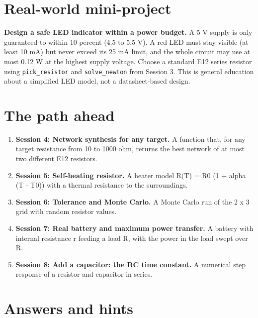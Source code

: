 \documentclass[11pt,a4paper]{article}
\begin{document}
\section{Real-world mini-project}
\textbf{Design a safe LED indicator within a power budget.} A 5 V supply is only guaranteed to within 10 percent (4.5 to 5.5 V). A red LED must stay visible (at least 10 mA) but never exceed its 25 mA limit, and the whole circuit may use at most 0.12 W at the highest supply voltage. Choose a standard E12 series resistor using \texttt{pick\_resistor} and \texttt{solve\_newton} from Session 3. This is general education about a simplified LED model, not a datasheet-based design.

\section{The path ahead}
\begin{enumerate}[nosep]
\item \textbf{Session 4: Network synthesis for any target.} A function that, for any target resistance from 10 to 1000 ohm, returns the best network of at most two different E12 resistors.
\item \textbf{Session 5: Self-heating resistor.} A heater model R(T) = R0 (1 + alpha (T - T0)) with a thermal resistance to the surroundings.
\item \textbf{Session 6: Tolerance and Monte Carlo.} A Monte Carlo run of the 2 x 3 grid with random resistor values.
\item \textbf{Session 7: Real battery and maximum power transfer.} A battery with internal resistance r feeding a load R, with the power in the load swept over R.
\item \textbf{Session 8: Add a capacitor: the RC time constant.} A numerical step response of a resistor and capacitor in series.
\end{enumerate}

\section{Answers and hints}
\end{document}
